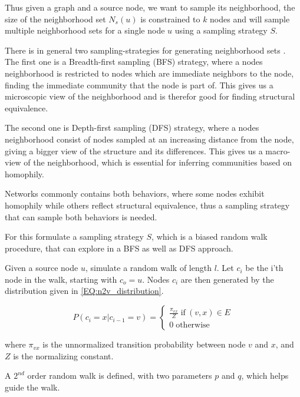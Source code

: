 Thus given a graph and a source node, we want to sample its neighborhood, the size of the neighborhood set $N_s(u)$ is constrained to $k$ nodes and will sample multiple neighborhood sets for a single node $u$ using a sampling strategy $S$.

There is in general two sampling-strategies for generating neighborhood sets \cite{Node2vec}. The first one is a Breadth-first sampling (BFS) strategy, where a nodes neighborhood is restricted to nodes which are immediate neighbors to the node, finding the immediate community that the node is part of. This gives us a microscopic view of the neighborhood and is therefor good for finding structural equivalence.

The second one is Depth-first sampling (DFS) strategy, where a nodes neighborhood consist of nodes sampled at an increasing distance from the node, giving a bigger view of the structure and its differences. This gives us a macro-view of the neighborhood, which is essential for inferring communities based on homophily.

Networks commonly contains both behaviors, where some nodes exhibit homophily while others reflect structural equivalence, thus a sampling strategy that can sample both behaviors is needed.

For this \cite{Node2vec} formulate a sampling strategy $S$, which is a biased random walk procedure, that can explore in a BFS as well as DFS approach.

Given a source node $u$, simulate a random walk of length $l$. Let $c_i$ be the i'th node in the walk, starting with $c_o = u$. Nodes $c_i$ are then generated by the distribution given in \autoref{EQ:n2v_distribution}.

\begin{equation}\label{EQ:n2v_distribution}
P(c_i = x | c_{i-1} = v) = 
\begin{cases} 
	\frac{\pi_{vx}}{Z}  \; \text{if} \: (v,x) \in E \\
	0 \; \text{otherwise}
\end{cases}
\end{equation}

where $\pi_{vx}$ is the unnormalized transition probability between node $v$ and $x$, and $Z$ is the normalizing constant.

A $2^{nd}$ order random walk is defined, with two parameters $p$ and $q$, which helps guide the walk.

